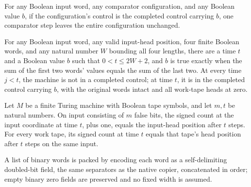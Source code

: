 \begin{lemma}
\label{Complexity.clCmp_idle}
\leanok
{}
For any Boolean input word, any comparator configuration, and any Boolean value $b$, if
the configuration’s control is the completed control carrying $b$, one comparator step
leaves the entire configuration unchanged.
\end{lemma}

\begin{lemma}
\label{Complexity.clCmp_first}
\leanok
{}
For any Boolean input word, any valid input-head position, four finite Boolean words,
and any natural number $W$ bounding all four lengths, there are a time $t$ and a Boolean
value $b$ such that $0<t\le 2W+2$, and $b$ is true exactly when the sum of the first two
words’ values equals the sum of the last two. At every time $j<t$, the machine is not in
a completed control; at time $t$, it is in the completed control carrying $b$, with the
original words intact and all work-tape heads at zero.
\end{lemma}

\begin{lemma}
\label{Complexity.clCounts_schedule}
\leanok
{}
Let $M$ be a finite Turing machine with Boolean tape symbols, and let $m,t$ be natural
numbers. On input consisting of $m$ false bits, the signed count at the input coordinate
at time $t$, plus one, equals the input-head position after $t$ steps. For every work
tape, its signed count at time $t$ equals that tape's head position after $t$ steps on
the same input.
\end{lemma}

\begin{definition}
\label{Complexity.clFields}
\leanok
{}
A list of binary words is packed by encoding each word as a self-delimiting doubled-bit field, the same separators as the native copier, concatenated in order; empty binary zero fields are preserved and no fixed width is assumed.
\end{definition}

